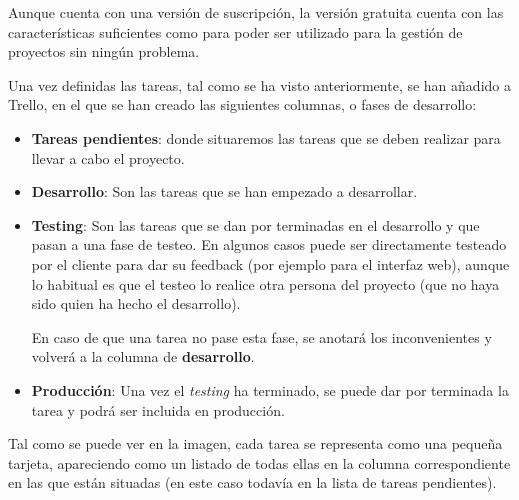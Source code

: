 \documentclass{\ClassPath/viu-tfm-template}
\begin{document}
Aunque cuenta con una versión de suscripción, la versión gratuita cuenta con las características suficientes como para poder ser utilizado para la gestión de proyectos sin ningún problema.

Una vez definidas las tareas, tal como se ha visto anteriormente, se han añadido a Trello, en el que se han creado las siguientes columnas, o fases de desarrollo:

\begin{itemize}
    \item \textbf{Tareas pendientes}: donde situaremos las tareas que se deben realizar para llevar a cabo el proyecto.

\end{itemize}

\begin{minipage}{0.60\linewidth}
    \begin{itemize}
        \item \textbf{Desarrollo}: Son las tareas que se han empezado a desarrollar.
        \item \textbf{Testing}: Son las tareas que se dan por terminadas en el desarrollo y que pasan a una fase de testeo. En algunos casos puede ser directamente testeado por el cliente para dar su feedback (por ejemplo para el interfaz web), aunque lo habitual es que el testeo lo realice otra persona del proyecto (que no haya sido quien ha hecho el desarrollo).

        En caso de que una tarea no pase esta fase, se anotará los inconvenientes y volverá a la columna de \textbf{desarrollo}.
        \item \textbf{Producción}: Una vez el \textit{testing} ha terminado, se puede dar por terminada la tarea y podrá ser incluida en producción.
    \end{itemize}

    Tal como se puede ver en la imagen, cada tarea se representa como una pequeña tarjeta, apareciendo como un listado de todas ellas en la columna correspondiente en las que están situadas (en este caso todavía en la lista de tareas pendientes).
\end{minipage}
\hfill
\end{document}
